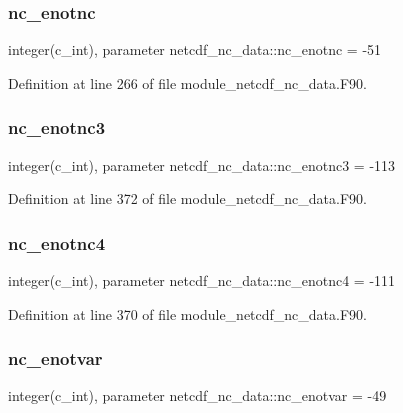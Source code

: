 \subsubsection{\texorpdfstring{nc\+\_\+enotnc}{nc\_enotnc}}
{\footnotesize\ttfamily integer(c\+\_\+int), parameter netcdf\+\_\+nc\+\_\+data\+::nc\+\_\+enotnc = -\/51}



Definition at line 266 of file module\+\_\+netcdf\+\_\+nc\+\_\+data.\+F90.

\mbox{\label{namespacenetcdf__nc__data_af7cee79d1f60767652c5a80ad1917aed}} 
\subsubsection{\texorpdfstring{nc\+\_\+enotnc3}{nc\_enotnc3}}
{\footnotesize\ttfamily integer(c\+\_\+int), parameter netcdf\+\_\+nc\+\_\+data\+::nc\+\_\+enotnc3 = -\/113}



Definition at line 372 of file module\+\_\+netcdf\+\_\+nc\+\_\+data.\+F90.

\mbox{\label{namespacenetcdf__nc__data_a2be3d7ec691b7c8803115abebe6bac27}} 
\subsubsection{\texorpdfstring{nc\+\_\+enotnc4}{nc\_enotnc4}}
{\footnotesize\ttfamily integer(c\+\_\+int), parameter netcdf\+\_\+nc\+\_\+data\+::nc\+\_\+enotnc4 = -\/111}



Definition at line 370 of file module\+\_\+netcdf\+\_\+nc\+\_\+data.\+F90.

\mbox{\label{namespacenetcdf__nc__data_ae87507dd9130d6f4ef66daa3626cc6c8}} 
\subsubsection{\texorpdfstring{nc\+\_\+enotvar}{nc\_enotvar}}
{\footnotesize\ttfamily integer(c\+\_\+int), parameter netcdf\+\_\+nc\+\_\+data\+::nc\+\_\+enotvar = -\/49}



